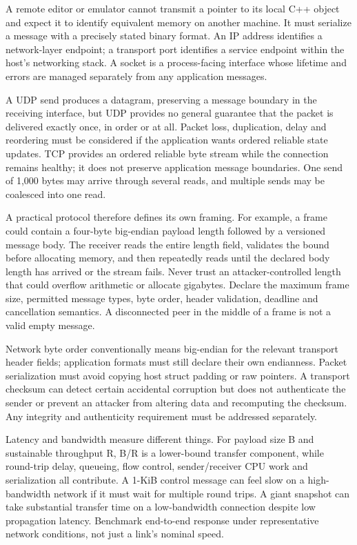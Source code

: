 \hypertarget{01-foundations-i-ch016-from-a-file-to-a-message-on-an-unreliable-network}{}

A remote editor or emulator cannot transmit a pointer to its local C++ object and expect it to identify equivalent memory on another machine. It must serialize a message with a precisely stated binary format. An IP address identifies a network-layer endpoint; a transport port identifies a service endpoint within the host's networking stack. A socket is a process-facing interface whose lifetime and errors are managed separately from any application messages.

A UDP send produces a datagram, preserving a message boundary in the receiving interface, but UDP provides no general guarantee that the packet is delivered exactly once, in order or at all. Packet loss, duplication, delay and reordering must be considered if the application wants ordered reliable state updates. TCP provides an ordered reliable byte stream while the connection remains healthy; it does not preserve application message boundaries. One send of 1,000 bytes may arrive through several reads, and multiple sends may be coalesced into one read.

A practical protocol therefore defines its own framing. For example, a frame could contain a four-byte big-endian payload length followed by a versioned message body. The receiver reads the entire length field, validates the bound before allocating memory, and then repeatedly reads until the declared body length has arrived or the stream fails. Never trust an attacker-controlled length that could overflow arithmetic or allocate gigabytes. Declare the maximum frame size, permitted message types, byte order, header validation, deadline and cancellation semantics. A disconnected peer in the middle of a frame is not a valid empty message.

Network byte order conventionally means big-endian for the relevant transport header fields; application formats must still declare their own endianness. Packet serialization must avoid copying host struct padding or raw pointers. A transport checksum can detect certain accidental corruption but does not authenticate the sender or prevent an attacker from altering data and recomputing the checksum. Any integrity and authenticity requirement must be addressed separately.

Latency and bandwidth measure different things. For payload size B and sustainable throughput R, B/R is a lower-bound transfer component, while round-trip delay, queueing, flow control, sender/receiver CPU work and serialization all contribute. A 1-KiB control message can feel slow on a high-bandwidth network if it must wait for multiple round trips. A giant snapshot can take substantial transfer time on a low-bandwidth connection despite low propagation latency. Benchmark end-to-end response under representative network conditions, not just a link's nominal speed.

